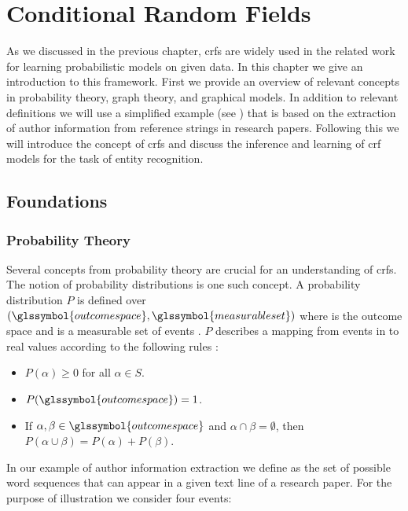 \chapter{Conditional Random Fields}\label{cha:crfs}

As we discussed in the previous chapter, \glspl{crf} are widely used in the related work for learning probabilistic models on given data.
In this chapter we give an introduction to this framework.
First we provide an overview of relevant concepts in probability theory, graph theory, and graphical models.
In addition to relevant definitions we will use a simplified example (see ) that is based on the extraction of author information from reference strings in research papers.
Following this we will introduce the concept of \glspl{crf} and discuss the inference and learning of \gls{crf} models for the task of entity recognition.\\

\section{Foundations}\label{sec:foundations}
\subsection{Probability Theory}\label{subsec:probability-theory}
Several concepts from probability theory are crucial for an understanding of \glspl{crf}.
The notion of \glspl{probability distribution} is one such concept.
A \gls{probability distribution} $P$ is defined over $(\glssymbol{outcome space},\glssymbol{measurable set})$ where  is the \gls{outcome space} and  is a \gls{measurable set} of \glspl{event} \citep{koller2009probabilistic}.
$P$ describes a mapping from events in  to real values according to the following rules \citep{koller2009probabilistic}:
\begin{itemize}
  \item $P(\alpha)\geq 0 $ for all $ \alpha \in S$.
  \item $P(\glssymbol{outcome space})=1$.
  \item If $\alpha,\beta\in \glssymbol{outcome space}$ and $\alpha\cap\beta = \emptyset$, then $P(\alpha\cup\beta)=P(\alpha)+P(\beta)$.
\end{itemize}

In our example of author information extraction we define  as the set of possible word sequences that can appear in a given text line of a research paper.
For the purpose of illustration we consider four events:

